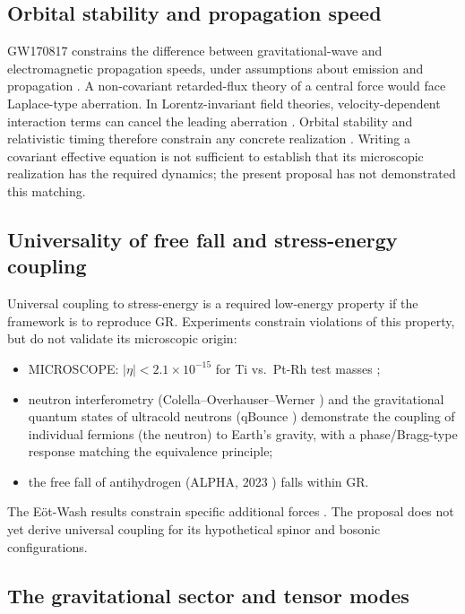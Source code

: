 \documentclass[11pt,a4paper]{article}
\begin{document}
\subsection{Orbital stability and propagation speed}\label{sec:aberration}

GW170817 constrains the difference between gravitational-wave and electromagnetic propagation
speeds, under assumptions about emission and propagation \cite{GW170817}. A non-covariant
retarded-flux theory of a central force would face Laplace-type aberration. In Lorentz-invariant
field theories, velocity-dependent interaction terms can cancel the leading aberration
\cite{Carlip2000}. Orbital stability and relativistic timing therefore constrain any concrete
realization \cite{Nordtvedt1977}. Writing a covariant effective equation is not sufficient to
establish that its microscopic realization has the required dynamics; the present proposal has not
demonstrated this matching.

\subsection{Universality of free fall and stress-energy coupling}

Universal coupling to stress-energy is a required low-energy property if the framework is to
reproduce GR. Experiments constrain violations of this property, but do not validate its
microscopic origin:
\begin{itemize}
\item MICROSCOPE: $|\eta| < 2.1\times10^{-15}$ for Ti vs.\ Pt-Rh test masses \cite{Touboul2022};
\item neutron interferometry (Colella--Overhauser--Werner \cite{Colella1975}) and the
gravitational quantum states of ultracold neutrons (qBounce \cite{Jenke2014}) demonstrate the
coupling of individual fermions (the neutron) to Earth's gravity, with a phase/Bragg-type response
matching the equivalence principle;
\item the free fall of antihydrogen (ALPHA, 2023 \cite{ALPHA2023}) falls within GR.
\end{itemize}
The E\"ot-Wash results constrain specific additional forces \cite{Lee2020}. The proposal does not
yet derive universal coupling for its hypothetical spinor and bosonic configurations.

\subsection{The gravitational sector and tensor modes}\label{sec:gravitonphoton}
\end{document}
